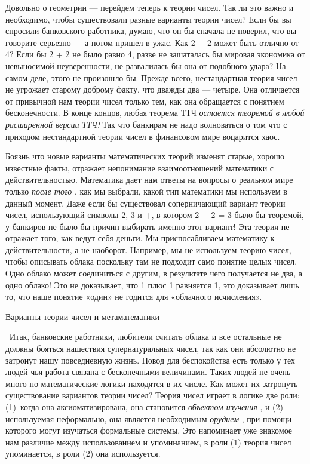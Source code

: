 \documentclass[../main.tex]{subfiles}
\begin{document}
Довольно о геометрии --- перейдем теперь к теории чисел. Так ли это важно и необходимо, чтобы существовали разные варианты теории чисел? Если бы вы спросили банковского работника, думаю, что он бы сначала не поверил, что вы говорите серьезно --- а потом пришел в ужас. Как 2 + 2 может быть отлично от 4? Если бы 2 + 2 не было равно 4, разве не зашаталась бы мировая экономика от невыносимой неуверенности, не развалилась бы она от подобного удара? На самом деле, этого не произошло бы. Прежде всего, нестандартная теория чисел не угрожает старому доброму факту, что дважды два --- четыре. Она отличается от привычной нам теории чисел только тем, как она обращается с понятием бесконечности. В конце концов, любая теорема ТТЧ \emph{остается теоремой в любой расширенной версии ТТЧ!} Так что банкирам не надо волноваться о том что с приходом нестандартной теории чисел в финансовом мире воцарится хаос.

Боязнь что новые варианты математических теорий изменят старые, хорошо известные факты, отражает непонимание взаимоотношений математики с действительностью. Математика дает нам ответы на вопросы о реальном мире только \emph{после того} , как мы выбрали, какой тип математики мы используем в данный момент. Даже если бы существовал соперничающий вариант теории чисел, использующий символы 2, 3 и +, в котором 2 + 2 = 3 было бы теоремой, у банкиров не было бы причин выбирать именно этот вариант! Эта теория не отражает того, как ведут себя деньги. Мы приспосабливаем математику к действительности, а не наоборот. Например, мы не используем теорию чисел, чтобы описывать облака поскольку там не подходит само понятие целых чисел. Одно облако может соединиться с другим, в результате чего получается не два, а одно облако! Это не доказывает, что 1 плюс 1 равняется 1, это доказывает лишь то, что наше понятие «один» не годится для «облачного исчисления».

Варианты теории чисел и метаматематики

~Итак, банковские работники, любители считать облака и все остальные не должны бояться нашествия супернатуральных чисел, так как они абсолютно не затронут нашу повседневную жизнь. Повод для беспокойства есть только у тех людей чья работа связана с бесконечными величинами. Таких людей не очень много но математические логики находятся в их числе. Как может их затронуть существование вариантов теории чисел? Теория чисел играет в логике две роли: (1)~когда она аксиоматизирована, она становится \emph{объектом изучения} , и (2) используемая неформально, она является необходимым \emph{орудием} , при помощи которого могут изучаться формальные системы. Это напоминает уже знакомое нам различие между использованием и упоминанием, в роли (1) теория чисел упоминается, в роли (2) она используется.
\end{document}
